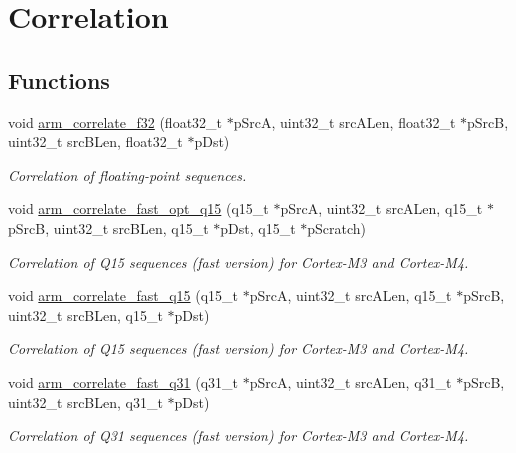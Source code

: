 \hypertarget{group__Corr}{}\section{Correlation}
\label{group__Corr}
\subsection*{Functions}
\begin{DoxyCompactItemize}
\item 
void \hyperlink{group__Corr_ga22021e4222773f01e9960358a531cfb8}{arm\+\_\+correlate\+\_\+f32} (float32\+\_\+t $\ast$p\+SrcA, uint32\+\_\+t src\+A\+Len, float32\+\_\+t $\ast$p\+SrcB, uint32\+\_\+t src\+B\+Len, float32\+\_\+t $\ast$p\+Dst)
\begin{DoxyCompactList}\small\item\em Correlation of floating-\/point sequences. \end{DoxyCompactList}\item 
void \hyperlink{group__Corr_ga40a0236b17220e8e22a22b5bc1c53c6b}{arm\+\_\+correlate\+\_\+fast\+\_\+opt\+\_\+q15} (q15\+\_\+t $\ast$p\+SrcA, uint32\+\_\+t src\+A\+Len, q15\+\_\+t $\ast$p\+SrcB, uint32\+\_\+t src\+B\+Len, q15\+\_\+t $\ast$p\+Dst, q15\+\_\+t $\ast$p\+Scratch)
\begin{DoxyCompactList}\small\item\em Correlation of Q15 sequences (fast version) for Cortex-\/\+M3 and Cortex-\/\+M4. \end{DoxyCompactList}\item 
void \hyperlink{group__Corr_gac8de3da44f58e86c2c86156276ca154f}{arm\+\_\+correlate\+\_\+fast\+\_\+q15} (q15\+\_\+t $\ast$p\+SrcA, uint32\+\_\+t src\+A\+Len, q15\+\_\+t $\ast$p\+SrcB, uint32\+\_\+t src\+B\+Len, q15\+\_\+t $\ast$p\+Dst)
\begin{DoxyCompactList}\small\item\em Correlation of Q15 sequences (fast version) for Cortex-\/\+M3 and Cortex-\/\+M4. \end{DoxyCompactList}\item 
void \hyperlink{group__Corr_gabecd3d7b077dbbef43f93e9e037815ed}{arm\+\_\+correlate\+\_\+fast\+\_\+q31} (q31\+\_\+t $\ast$p\+SrcA, uint32\+\_\+t src\+A\+Len, q31\+\_\+t $\ast$p\+SrcB, uint32\+\_\+t src\+B\+Len, q31\+\_\+t $\ast$p\+Dst)
\begin{DoxyCompactList}\small\item\em Correlation of Q31 sequences (fast version) for Cortex-\/\+M3 and Cortex-\/\+M4. \end{DoxyCompactList}\item 

\end{DoxyCompactItemize}
